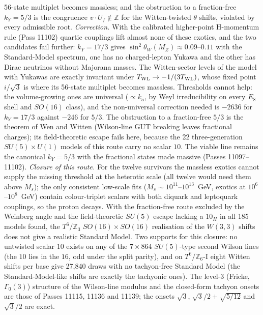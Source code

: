 56-state multiplet becomes massless; and the obstruction to a fraction-free $k_Y=5/3$ is the congruence $v\cdot U_f\notin\mathbb Z$ for
the Witten-twisted $\theta$ shifts, violated by every admissible root. 
\emph{Correction.} With the calibrated higher-point H-momentum rule (Pass 11102) quartic couplings lift almost none of
these exotics, and the two candidates fail further: $k_Y=17/3$ gives $\sin^2\theta_W(M_Z)\approx0.09$--$0.11$ with the Standard-Model
spectrum, one has no charged-lepton Yukawa and the other has Dirac neutrinos without Majorana masses. The Witten-sector
levels of the model with Yukawas are exactly invariant under $T_{\rm WL}\to-1/(3T_{\rm WL})$, whose fixed point $i/\sqrt3$ is where its
56-state multiplet becomes massless. 
Thresholds cannot help: the volume-growing ones are universal ($\propto k_a$, by Weyl irreducibility on every $E_8$ shell and
$SO(16)$ class), and the non-universal correction needed is $-2636$ for $k_Y=17/3$ against $-246$ for $5/3$. The obstruction to
a fraction-free $5/3$ is the theorem of Wen and Witten (Wilson-line GUT breaking leaves fractional charges); its field-theoretic
escape fails here, because the 22 three-generation $SU(5)\times U(1)$ models of this route carry no scalar $10$. The viable line
remains the canonical $k_Y=5/3$ with the fractional states made massive (Passes 11097--11102). 
\emph{Closure of this route.} For the twelve survivors the massless exotics cannot supply the missing threshold at the
heterotic scale (all twelve would need them above $M_s$); the only consistent low-scale fits ($M_s\sim10^{11}$--$10^{13}$~GeV,
exotics at $10^6$--$10^8$~GeV) contain colour-triplet scalars with both diquark and leptoquark couplings, so the proton decays.
With the fraction-free route excluded by the Weinberg angle and the field-theoretic $SU(5)$ escape lacking a $10_H$ in all 185
models found, the $T^6/\mathbb Z_3$ $SO(16)\times SO(16)$ realisation of the $W(3,3)$ shifts does not give a realistic Standard
Model. 
Two supports for this closure: no untwisted scalar $10$ exists on any of the $7\times864$ $SU(5)$-type second Wilson lines (the
$10$ lies in the $16$, odd under the split parity), and on $T^6/\mathbb Z_6$-I eight Witten shifts per base give 27{,}840 draws with
no tachyon-free Standard Model (the Standard-Model-like shifts are exactly the tachyonic ones). The level-3 (Fricke, $\Gamma_0(3)$)
structure of the Wilson-line modulus and the closed-form tachyon onsets are those of Passes 11115, 11136 and 11139; the onsets
$\sqrt3$, $\sqrt3/2+\sqrt{5/12}$ and $\sqrt3/2$ are exact. 

